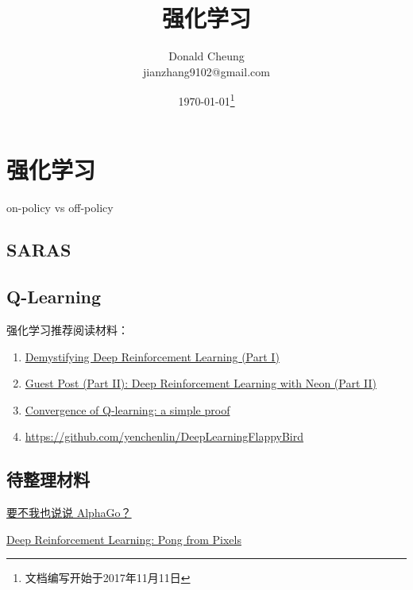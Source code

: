 \ifx\mlnotes\undefined
    \providecommand{\notesroot}{../..}
    \providecommand{\rlroot}{.}

    \title{强化学习}
    \author{Donald Cheung\\jianzhang9102@gmail.com}
    \date{\today\footnote{文档编写开始于2017年11月11日}}

    
\else
    \providecommand{\rlroot}{\mlroot/rl}
\fi

\chapter{强化学习}

on-policy vs off-policy

\section{SARAS}

\section{Q-Learning}

强化学习推荐阅读材料：
\begin{enumerate}
    \item \href{https://ai.intel.com/demystifying-deep-reinforcement-learning/}{Demystifying Deep Reinforcement Learning (Part I)}
    \item \href{https://ai.intel.com/deep-reinforcement-learning-with-neon/}{Guest Post (Part II): Deep Reinforcement Learning with Neon (Part II)}
    \item \href{http://simplecore-dev.intel.com/nervana/wp-content/uploads/sites/55/2015/12/ProofQlearning.pdf}{Convergence of Q-learning: a simple proof}
    \item \url{https://github.com/yenchenlin/DeepLearningFlappyBird}
\end{enumerate}

\section{待整理材料}

\href{https://mp.weixin.qq.com/s?__biz=MzA5MDE2MjQ0OQ==&mid=2652786766&idx=1&sn=bf6f3189e4a16b9f71f985392c9dc70b&chksm=8be52430bc92ad2644838a9728d808d000286fb9ca7ced056392f1210300286f63bd991bde84#rd}{要不我也说说 AlphaGo？}

\href{http://karpathy.github.io/2016/05/31/rl/}{Deep Reinforcement Learning: Pong from Pixels}



